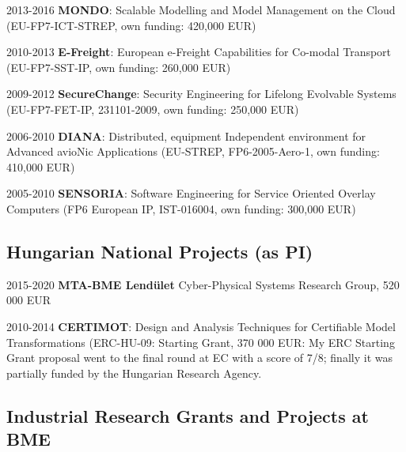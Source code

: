 \begin{yearlist}
\item[2013-2016] \textbf{MONDO}: Scalable Modelling and Model Management on the Cloud (EU-FP7-ICT-STREP, own funding: 420,000 EUR) 
\item[2010-2013] \textbf{E-Freight}: European e-Freight Capabilities for Co-modal Transport (EU-FP7-SST-IP, own funding: 260,000 EUR) 
\item[2009-2012] \textbf{SecureChange}: Security Engineering for Lifelong Evolvable Systems (EU-FP7-FET-IP, 231101-2009, own funding: 250,000 EUR) 
\item[2006-2010] \textbf{DIANA}: Distributed, equipment Independent environment for Advanced avioNic Applications (EU-STREP, FP6-2005-Aero-1, own funding: 410,000 EUR) 
\item[2005-2010] \textbf{SENSORIA}: Software Engineering for Service Oriented
Overlay Computers (FP6 European IP, IST-016004, own funding: 300,000 EUR)  
\end{yearlist}


\subsection{Hungarian National Projects (as PI)}

\begin{yearlist}
\item[2015-2020] \textbf{MTA-BME Lend\"ulet} Cyber-Physical Systems Research Group, 520 000 EUR
\item[2010-2014] \textbf{CERTIMOT}: Design and Analysis Techniques for Certifiable Model Transformations (ERC-HU-09: Starting Grant, 370 000 EUR: My ERC Starting Grant proposal went to the final round at EC with a score of 7/8;
finally it was partially funded by the Hungarian Research Agency.
\end{yearlist}



\subsection{Industrial Research Grants and Projects at BME} 

